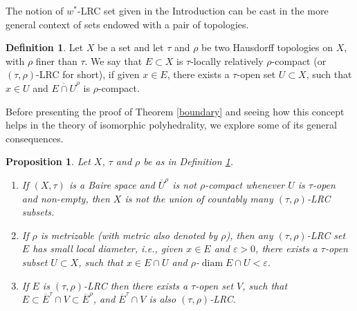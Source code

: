 \documentclass[12pt,a4paper]{amsart}
\newtheorem{proposition}[theorem]{Proposition}
\theoremstyle{definition}
\newtheorem{definition}[theorem]{Definition}
\theoremstyle{remark}
\DeclareMathOperator{\diam}{diam}
\newcommand{\cl}[1]{\ensuremath{\overline{{#1}}}}
\newcommand{\eps}{\ensuremath{\varepsilon}}
\begin{document}
The notion of $w^*$-LRC set given in the Introduction can be cast in
the more general context of sets endowed with a pair of topologies.

\begin{definition}\label{lrc}
Let $X$ be a set and let $\tau$ and $\rho$ be two Hausdorff topologies on $X$,
with $\rho$ finer than $\tau$. We say that $E \subset X$ is $\tau$-locally
relatively $\rho$-compact (or $(\tau,\rho)$-LRC for short), if given
$x \in E$, there exists a $\tau$-open set $U \subset X$, such that
$x \in U$ and $\cl{E \cap U}^{\rho}$ is $\rho$-compact.
\end{definition}

Before presenting the proof of Theorem \ref{boundary} and seeing how
this concept helps in the theory of isomorphic polyhedrality, we
explore some of its general consequences.

\begin{proposition}\label{lrctheory}
Let $X$, $\tau$ and $\rho$ be as in Definition \ref{lrc}.
\begin{enumerate}
\item If $(X,\tau)$ is a Baire space and $\cl{U}^\rho$ is not $\rho$-compact
whenever $U$ is $\tau$-open and non-empty, then $X$ is not the union of
countably many $(\tau,\rho)$-LRC subsets.
\item If $\rho$ is metrizable (with metric also denoted by $\rho$), then
any $(\tau,\rho)$-LRC set $E$ has small local diameter, i.e., given $x \in E$
and $\eps>0$, there exists a $\tau$-open subset $U \subset X$, such
that $x \in E \cap U$ and $\rho$-$\diam{E \cap U} < \eps$.
\item If $E$ is $(\tau,\rho)$-LRC then there exists a $\tau$-open set
$V$, such that $E \subset \cl{E}^\tau \cap V \subset \cl{E}^\rho$,
and $\cl{E}^\tau \cap V$ is also $(\tau,\rho)$-LRC.
\end{enumerate}
\end{proposition}
\end{document}
